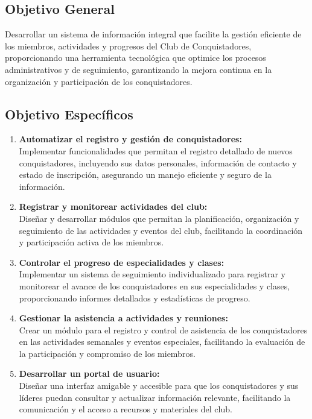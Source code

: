 \documentclass[stu, 12pt, letterpaper, donotrepeattitle, floatsintext, natbib]{apa7}
\begin{document}
    \subsection{Objetivo General}
    Desarrollar un sistema de informaci\'on integral que facilite la gesti\'on eficiente de los miembros, actividades y progresos del Club de Conquistadores, proporcionando una herramienta tecnol\'ogica que optimice los procesos administrativos y de seguimiento, garantizando la mejora continua en la organizaci\'on y participaci\'on de los conquistadores.

    \subsection{Objetivo Espec\'ificos}
    \begin{enumerate}
        \item\textbf{Automatizar el registro y gesti\'on de conquistadores:}\\Implementar funcionalidades que permitan el registro detallado de nuevos conquistadores, incluyendo sus datos personales, informaci\'on de contacto y estado de inscripci\'on, asegurando un manejo eficiente y seguro de la informaci\'on.
        \item\textbf{Registrar y monitorear actividades del club:}\\Diseñar y desarrollar m\'odulos que permitan la planificaci\'on, organizaci\'on y seguimiento de las actividades y eventos del club, facilitando la coordinaci\'on y participaci\'on activa de los miembros.
        \item\textbf{Controlar el progreso de especialidades y clases:}\\Implementar un sistema de seguimiento individualizado para registrar y monitorear el avance de los conquistadores en sus especialidades y clases, proporcionando informes detallados y estad\'isticas de progreso.
        \item\textbf{Gestionar la asistencia a actividades y reuniones:}\\Crear un m\'odulo para el registro y control de asistencia de los conquistadores en las actividades semanales y eventos especiales, facilitando la evaluaci\'on de la participaci\'on y compromiso de los miembros.
        \item\textbf{Desarrollar un portal de usuario:}\\Dise\~{n}ar una interfaz amigable y accesible para que los conquistadores y sus l\'ideres puedan consultar y actualizar informaci\'on relevante, facilitando la comunicaci\'on y el acceso a recursos y materiales del club.

\end{enumerate}
\end{document}
